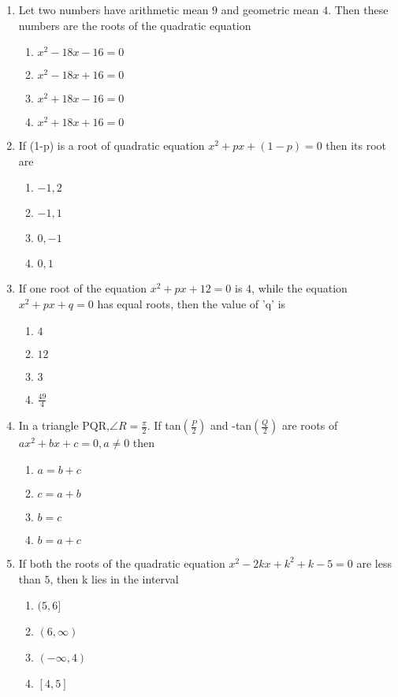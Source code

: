 \documentclass[journal,12pt,twocolumn]{IEEEtran}
\begin{document}
\begin{enumerate}[label=\arabic*]
\item Let two numbers have arithmetic mean $9$ and geometric mean $4$. Then these numbers are the roots of the quadratic equation
\begin{enumerate}
\item $x^2-18x-16=0$
\item $x^2-18x+16=0$ 
\item $x^2+18x-16=0$
\item $x^2+18x+16=0$ 
\end{enumerate}
 
\item If (1-p) is a root of quadratic equation $x^2+px+(1-p)=0$ then its root are
\begin{enumerate}
\item $-1,2$
\item $-1,1$
\item $0,-1$
\item $0,1$
\end{enumerate}

\item If one root of the equation $x^2+px+12=0$ is $4$, while the equation $x^2+px+q=0$ has equal roots, then the value of 'q' is
\begin{enumerate}
\item $4$
\item $12$ 
\item $3$
\item $\frac{49}{4}$ 
\end{enumerate}

\item In a triangle PQR,$\angle{R}=\frac{\pi}{2}$. If tan$(\frac{P}{2})$ and -tan$(\frac{Q}{2})$ are roots of $ax^2+bx+c=0, a\neq0$ then
\begin{enumerate}
\item $a=b+c$
\item $c=a+b$
\item $b=c$
\item $b=a+c$ 
\end{enumerate}

\item If both the roots of the quadratic equation $x^2-2kx+k^2+k-5=0$ are less than $5$, then k lies in the interval
\begin{enumerate}
\item $(5,6]$
\item $(6,\infty)$
\item $(-\infty, 4)$
\item $[4,5]$ 
\end{enumerate}


\end{enumerate}
\end{document}
